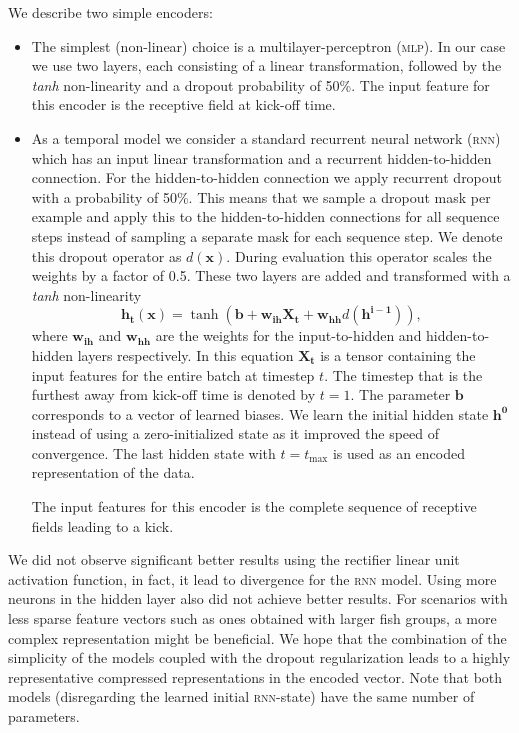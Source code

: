 \documentclass[nobib, a4paper]{tufte-handout}
\begin{document}
We describe two simple encoders:
\begin{itemize}
\item The simplest (non-linear) choice is a multilayer-perceptron (\textsc{mlp}).
  In our case we use two layers, each consisting of a linear transformation, followed by the \textit{tanh} non-linearity and a dropout probability of 50\%\autocite{dropout}.
  The input feature for this encoder is the receptive field at kick-off time.
\item
  As a temporal model we consider a standard recurrent neural network (\textsc{rnn}) which has an input linear transformation and a recurrent hidden-to-hidden connection.
  For the hidden-to-hidden connection we apply recurrent dropout with a probability of 50\%\autocite{recurrentDropout}.
  This means that we sample a dropout mask per example and apply this to the hidden-to-hidden connections for all sequence steps instead of sampling a separate mask for each sequence step.
  We denote this dropout operator as \(d(\bm{x})\).
  During evaluation this operator scales the weights by a factor of 0.5.
  These two layers are added and transformed with a \textit{tanh} non-linearity
  \begin{equation*}
    \bm{h_t} (\bm{x}) = \operatorname{tanh} \left( \bm{b} + \bm{w_{ih}} \bm{X_t} + \bm{w_{hh}} d (\bm{h^{i-1}}) \right),
  \end{equation*}
  where \(\bm{w_{ih}}\) and \(\bm{w_{hh}}\) are the weights for the input-to-hidden and hidden-to-hidden layers respectively.
  In this equation $\bm{X_t}$ is a tensor containing the input features for the entire batch at timestep \(t\).
  The timestep that is the furthest away from kick-off time is denoted by $t = 1$.
  The parameter \(\bm{b}\) corresponds to a vector of learned biases.
  We learn the initial hidden state \(\bm{h^0}\) instead of using a zero-initialized state as it improved the speed of convergence.
  The last hidden state with \(t = t_\text{max}\) is used as an encoded representation of the data.

  The input features for this encoder is the complete sequence of receptive fields leading to a kick.%
\end{itemize}
We did not observe significant better results using the rectifier linear unit activation function, in fact, it lead to divergence for the \textsc{rnn} model.
Using more neurons in the hidden layer also did not achieve better results.
For scenarios with less sparse feature vectors such as ones obtained with larger fish groups, a more complex representation might be beneficial.
We hope that the combination of the simplicity of the models coupled with the dropout regularization leads to a highly representative compressed representations in the encoded vector.
Note that both models (disregarding the learned initial \textsc{rnn}-state) have the same number of parameters.
\end{document}
